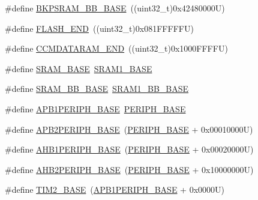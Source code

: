 \begin{DoxyCompactItemize}
\item 
\#define \hyperlink{group___peripheral__memory__map_gaee19a30c9fa326bb10b547e4eaf4e250}{B\+K\+P\+S\+R\+A\+M\+\_\+\+B\+B\+\_\+\+B\+A\+SE}~((uint32\+\_\+t)0x42480000\+U)
\item 
\#define \hyperlink{group___peripheral__memory__map_ga8be554f354e5aa65370f6db63d4f3ee4}{F\+L\+A\+S\+H\+\_\+\+E\+ND}~((uint32\+\_\+t)0x081\+F\+F\+F\+F\+F\+U)
\item 
\#define \hyperlink{group___peripheral__memory__map_ga9fbe263946209e6f09faf93512bd2f9a}{C\+C\+M\+D\+A\+T\+A\+R\+A\+M\+\_\+\+E\+ND}~((uint32\+\_\+t)0x1000\+F\+F\+F\+F\+U)
\item 
\#define \hyperlink{group___peripheral__memory__map_ga05e8f3d2e5868754a7cd88614955aecc}{S\+R\+A\+M\+\_\+\+B\+A\+SE}~\hyperlink{group___peripheral__memory__map_ga7d0fbfb8894012dbbb96754b95e562cd}{S\+R\+A\+M1\+\_\+\+B\+A\+SE}
\item 
\#define \hyperlink{group___peripheral__memory__map_gad3548b6e2f017f39d399358f3ac98454}{S\+R\+A\+M\+\_\+\+B\+B\+\_\+\+B\+A\+SE}~\hyperlink{group___peripheral__memory__map_gac4c4f61082e4b168f29d9cf97dc3ca5c}{S\+R\+A\+M1\+\_\+\+B\+B\+\_\+\+B\+A\+SE}
\item 
\#define \hyperlink{group___peripheral__memory__map_ga45666d911f39addd4c8c0a0ac3388cfb}{A\+P\+B1\+P\+E\+R\+I\+P\+H\+\_\+\+B\+A\+SE}~\hyperlink{group___peripheral__memory__map_ga9171f49478fa86d932f89e78e73b88b0}{P\+E\+R\+I\+P\+H\+\_\+\+B\+A\+SE}
\item 
\#define \hyperlink{group___peripheral__memory__map_ga25b99d6065f1c8f751e78f43ade652cb}{A\+P\+B2\+P\+E\+R\+I\+P\+H\+\_\+\+B\+A\+SE}~(\hyperlink{group___peripheral__memory__map_ga9171f49478fa86d932f89e78e73b88b0}{P\+E\+R\+I\+P\+H\+\_\+\+B\+A\+SE} + 0x00010000\+U)
\item 
\#define \hyperlink{group___peripheral__memory__map_ga811a9a4ca17f0a50354a9169541d56c4}{A\+H\+B1\+P\+E\+R\+I\+P\+H\+\_\+\+B\+A\+SE}~(\hyperlink{group___peripheral__memory__map_ga9171f49478fa86d932f89e78e73b88b0}{P\+E\+R\+I\+P\+H\+\_\+\+B\+A\+SE} + 0x00020000\+U)
\item 
\#define \hyperlink{group___peripheral__memory__map_gaeedaa71d22a1948492365e2cd26cfd46}{A\+H\+B2\+P\+E\+R\+I\+P\+H\+\_\+\+B\+A\+SE}~(\hyperlink{group___peripheral__memory__map_ga9171f49478fa86d932f89e78e73b88b0}{P\+E\+R\+I\+P\+H\+\_\+\+B\+A\+SE} + 0x10000000\+U)
\item 
\#define \hyperlink{group___peripheral__memory__map_ga00d0fe6ad532ab32f0f81cafca8d3aa5}{T\+I\+M2\+\_\+\+B\+A\+SE}~(\hyperlink{group___peripheral__memory__map_ga45666d911f39addd4c8c0a0ac3388cfb}{A\+P\+B1\+P\+E\+R\+I\+P\+H\+\_\+\+B\+A\+SE} + 0x0000\+U)

\end{DoxyCompactItemize}
